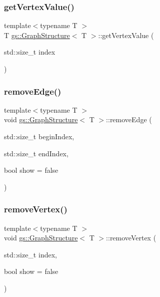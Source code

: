 \mbox{\label{classgs_1_1_graph_structure_a0adafe2cbe3eb635da12957b9b0ad803}} 
\subsubsection{\texorpdfstring{get\+Vertex\+Value()}{getVertexValue()}}
{\footnotesize\ttfamily template$<$typename T $>$ \\
T \mbox{\hyperlink{classgs_1_1_graph_structure}{gs\+::\+Graph\+Structure}}$<$ T $>$\+::get\+Vertex\+Value (\begin{DoxyParamCaption}\item[{std\+::size\+\_\+t}]{index }\end{DoxyParamCaption})}

\mbox{\label{classgs_1_1_graph_structure_aa27a2bd0421823f44ac670b691cedcbd}} 
\subsubsection{\texorpdfstring{remove\+Edge()}{removeEdge()}}
{\footnotesize\ttfamily template$<$typename T $>$ \\
void \mbox{\hyperlink{classgs_1_1_graph_structure}{gs\+::\+Graph\+Structure}}$<$ T $>$\+::remove\+Edge (\begin{DoxyParamCaption}\item[{std\+::size\+\_\+t}]{begin\+Index,  }\item[{std\+::size\+\_\+t}]{end\+Index,  }\item[{bool}]{show = {\ttfamily false} }\end{DoxyParamCaption})}

\mbox{\label{classgs_1_1_graph_structure_a3ce672fa2de3985fba1d1111efad2878}} 
\subsubsection{\texorpdfstring{remove\+Vertex()}{removeVertex()}}
{\footnotesize\ttfamily template$<$typename T $>$ \\
void \mbox{\hyperlink{classgs_1_1_graph_structure}{gs\+::\+Graph\+Structure}}$<$ T $>$\+::remove\+Vertex (\begin{DoxyParamCaption}\item[{std\+::size\+\_\+t}]{index,  }\item[{bool}]{show = {\ttfamily false} }\end{DoxyParamCaption})}

